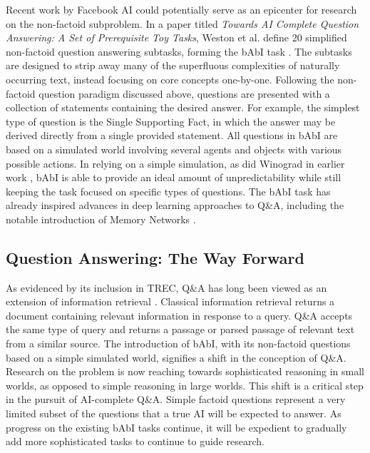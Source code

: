 Recent work by Facebook AI could potentially serve as an epicenter for research on the non-factoid subproblem. In a paper titled \textit{Towards AI Complete Question Answering: A Set of Prerequisite Toy Tasks}, Weston et al. define 20 simplified non-factoid question answering subtasks, forming the bAbI task  \citep{weston2015towards}. The subtasks are designed to strip away many of the superfluous complexities of naturally occurring text, instead focusing on core concepts one-by-one. Following the non-factoid question paradigm discussed above, questions are presented with a collection of statements containing the desired answer. For example, the simplest type of question is the Single Supporting Fact, in which the answer may be derived directly from a single provided statement. All questions in bAbI are based on a simulated world involving several agents and objects with various possible actions. In relying on a simple simulation, as did Winograd in earlier work  \citep{winograd1971procedures}, bAbI is able to provide an ideal amount of unpredictability while still keeping the task focused on specific types of questions. The bAbI task has already inspired advances in deep learning approaches to Q\&A, including the notable introduction of Memory Networks  \citep{sukhbaatar2015weakly}.

\subsection{Question Answering: The Way Forward}

As evidenced by its inclusion in TREC, Q\&A has long been viewed as an extension of information retrieval  \citep{kolomiyets2011survey}. Classical information retrieval returns a document containing relevant information in response to a query. Q\&A accepts the same type of query and returns a passage or parsed passage of relevant text from a similar source. The introduction of bAbI, with its non-factoid questions based on a simple simulated world, signifies a shift in the conception of Q\&A. Research on the problem is now reaching towards sophisticated reasoning in small worlds, as opposed to simple reasoning in large worlds. This shift is a critical step in the pursuit of AI-complete Q\&A. Simple factoid questions represent a very limited subset of the questions that a true AI will be expected to answer. As progress on the existing bAbI tasks continue, it will be expedient to gradually add more sophisticated tasks to continue to guide research.

